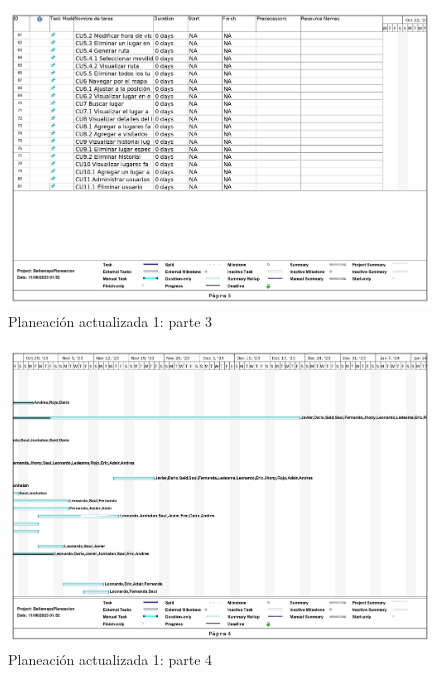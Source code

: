 \documentclass{article}
\begin{document}
\begin{figure}[h]
    \centering
    \includegraphics[width=1\linewidth]{BellamapsPlaneacionA1_3.jpg}
    \caption{Planeación actualizada 1: parte 3}
    \label{fig:Planeación actualizada 1  parte 3}
\end{figure}
\begin{figure}[h]
    \centering
    \includegraphics[width=1\linewidth]{BellamapsPlaneacionA1_4.jpg}
    \caption{Planeación actualizada 1: parte 4}
    \label{fig:Planeación actualizada 1  parte 4}
\end{figure}
\end{document}
